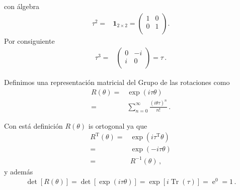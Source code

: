 con álgebra
\begin{align}
  \tau^2=&\boldsymbol{1}_{2\times2}=
  \begin{pmatrix}
    1 & 0\\
    0 & 1\\
  \end{pmatrix}. 
\end{align}
Por consiguiente
\begin{align*}
  \tau^3=&  \begin{pmatrix}
    0 & -i\\
    i & 0\\
  \end{pmatrix}=\tau\,.
\end{align*}

\begin{frame}

  

Definimos una representación matricial del Grupo de las rotaciones como
\begin{align}
  \label{eq:tye}
  R(\theta)=&\exp \left(i \tau \theta  \right) \nonumber\\
=&\sum_{n=0}^{\infty}\frac{\left(i \theta\tau \right)^{n}}{n!}\,.
\end{align}

Con está definición $R(\theta)$ is ortogonal ya que
\begin{align}
  R^{\operatorname{T}}(\theta)=& \exp \left(i \tau^{\operatorname{T}} \theta  \right) \nonumber\\
        =& \exp \left(-i \tau \theta  \right) \nonumber\\
        =&R^{-1}(\theta)\,,
\end{align}
y además
\begin{align}
  \operatorname{det}[R(\theta)]=\operatorname{det} \left[ \exp \left(i \tau \theta  \right)  \right]
  =\exp \left[ i \operatorname{Tr}(\tau) \right]=\operatorname{e}^0=1\,.
\end{align}




\end{frame}
